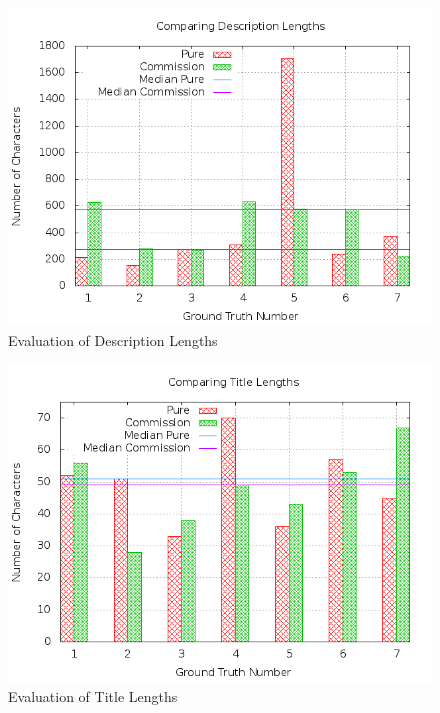 \begin{figure}
\centering
\includegraphics[scale=0.55]{images/plots/crowdsourcing/plot_description_length.png}
\caption{Evaluation of Description Lengths}
\label{crowdsourcing_desc_length}
\end{figure}
\begin{figure}
\centering
\includegraphics[scale=0.55]{images/plots/crowdsourcing/plot_title_length.png}
\caption{Evaluation of Title Lengths}
\label{crowdsourcing_desc_length}
\end{figure}
